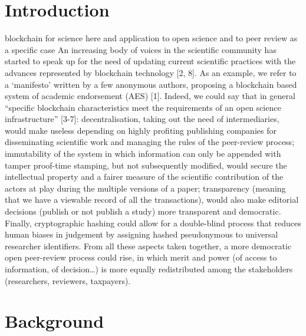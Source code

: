 \documentclass[runningheads]{llncs}
\begin{document}
\section{Introduction}
blockchain for science here and application to open science and to peer review as a specific case
An increasing body of voices in the scientific community has started to speak up for the need of updating current scientific practices with the advances represented by blockchain technology [2, 8]. As an example, we refer to a ‘manifesto’ written by a few anonymous authors, proposing a blockchain based system of academic endorsement (AES) [1]. Indeed, we could say that in general “specific blockchain characteristics meet the requirements of an open science infrastructure” [3-7]: decentralisation, taking out the need of intermediaries, would make useless depending on highly profiting publishing companies for disseminating scientific work and managing the rules of the peer-review process; immutability of the system in which information can only be appended with tamper proof-time stamping,  but not subsequently modified, would secure the intellectual property and a fairer measure of the scientific contribution of the actors at play during the multiple versions of a paper; transparency (meaning that we have a viewable record of all the transactions), would also make editorial decisions (publish or not publish a study) more transparent and democratic. Finally, cryptographic hashing could allow for a double-blind process that reduces human biases in judgement by assigning hashed pseudonymous to universal researcher identifiers. From all these aspects taken together, a more democratic open peer-review  process could rise, in which merit and power (of access to information, of decision…) is more equally redistributed among the stakeholders (researchers, reviewers, taxpayers).

\section{Background}
\end{document}
